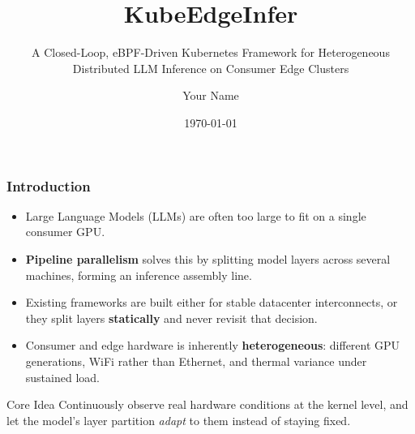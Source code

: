 \documentclass[aspectratio=169,11pt]{beamer}
\title{KubeEdgeInfer}
\subtitle{A Closed-Loop, eBPF-Driven Kubernetes Framework for Heterogeneous
          Distributed LLM Inference on Consumer Edge Clusters}
\author{Your Name}
\institute{Department of \rule{1.2cm}{0.4pt}\\Guide: Sir's Name}
\date{\today}
\begin{document}
\begin{frame}[plain]
  \titlepage
\end{frame}

\begin{frame}
  \frametitle{Introduction}
  \begin{itemize}\itemsep0.55em
    \item Large Language Models (LLMs) are often too large to fit on a single
      consumer GPU.
    \item \textbf{Pipeline parallelism} solves this by splitting model layers
      across several machines, forming an inference assembly line.
    \item Existing frameworks are built either for stable datacenter
      interconnects, or they split layers \textbf{statically} and never revisit
      that decision.
    \item Consumer and edge hardware is inherently \textbf{heterogeneous}:
      different GPU generations, WiFi rather than Ethernet, and thermal variance
      under sustained load.
  \end{itemize}
  \vfill
  \begin{block}{Core Idea}
    Continuously observe real hardware conditions at the kernel level, and let
    the model's layer partition \emph{adapt} to them instead of staying fixed.
  \end{block}
\end{frame}
\end{document}
